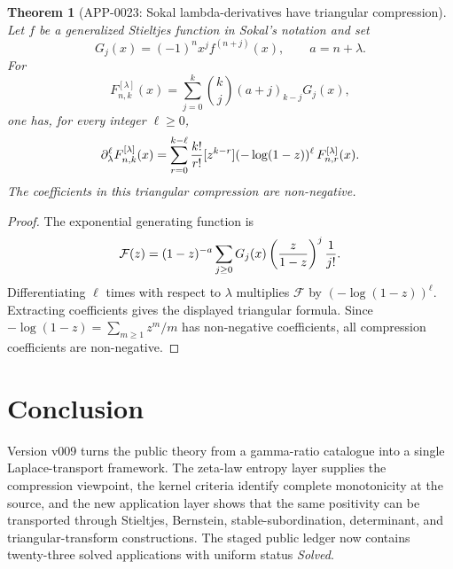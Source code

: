 \documentclass[11pt]{article}
\numberwithin{equation}{section}
\newtheorem{theorem}{Theorem}[section]
\theoremstyle{definition}
\theoremstyle{remark}
\newcommand{\1}{\mathbf 1}
\begin{document}
\begin{theorem}[APP-0023: Sokal lambda-derivatives have triangular compression]
\label{thm:app23-sokal-lambda}
Let \(f\) be a generalized Stieltjes function in Sokal's notation and set
\[
  G_j(x)=(-1)^n x^j f^{(n+j)}(x),\qquad a=n+\lambda .
\]
For
\[
  F^{[\lambda]}_{n,k}(x)
   =\sum_{j=0}^k {k\choose j}(a+j)_{k-j}G_j(x),
\]
one has, for every integer \(\ell\ge0\),
\[
 \partial_\lambda^\ell F^{[\lambda]}_{n,k}(x)
 =\sum_{r=0}^{k-\ell}{k!\over r!}
   [z^{k-r}](-\log(1-z))^\ell\,F^{[\lambda]}_{n,r}(x).
\]
The coefficients in this triangular compression are non-negative.
\end{theorem}

\begin{proof}
The exponential generating function is
\[
 \mathcal F(z)
 =(1-z)^{-a}\sum_{j\ge0}G_j(x)
      \left({z\over 1-z}\right)^j{1\over j!}.
\]
Differentiating \(\ell\) times with respect to \(\lambda\) multiplies
\(\mathcal F\) by \((-\log(1-z))^\ell\).  Extracting coefficients gives the
displayed triangular formula.  Since
\(-\log(1-z)=\sum_{m\ge1}z^m/m\) has non-negative coefficients, all compression
coefficients are non-negative.
\end{proof}

\section{Conclusion}

Version v009 turns the public theory from a gamma-ratio catalogue into a
single Laplace-transport framework.  The zeta-law entropy layer supplies the
compression viewpoint, the kernel criteria identify complete monotonicity at
the source, and the new application layer shows that the same positivity can be
transported through Stieltjes, Bernstein, stable-subordination, determinant,
and triangular-transform constructions.  The staged public ledger now contains
twenty-three solved applications with uniform status \emph{Solved}.
\end{document}
